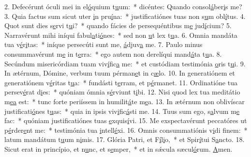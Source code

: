 2. Defecérunt óculi mei in el\uline{ó}quium t\uline{u}um:~* dicéntes: Quando consol\uline{á}ber\uline{i}s me?
3. Quia factus sum sicut uter \uline{i}n pru\uline{í}na:~* justificatiónes tuas non s\uline{u}m obl\uline{í}tus.
4. Quot sunt dies s\uline{e}rvi t\uline{u}i?~* quando fácies de persequéntibus m\uline{e} jud\uline{í}cium?
5. Narravérunt mihi iníqui fabul\uline{a}ti\uline{ó}nes:~* sed non \uline{u}t lex t\uline{u}a.
6. Omnia mandáta tua v\uline{é}r\uline{i}tas:~* iníque persecúti sunt me, \uline{á}djuv\uline{a} me.
7. Paulo minus consummavérunt m\uline{e} in t\uline{e}rra:~* ego autem non derelíqui mand\uline{á}ta t\uline{u}a.
8. Secúndum misericórdiam tuam viv\uline{í}fic\uline{a} me:~* et custódiam testimónia \uline{o}ris t\uline{u}i.
9. In ætérnum, Dómine, verbum tuum pérman\uline{e}t in c\uline{æ}lo.
10. In generatiónem et generatiónem v\uline{é}ritas t\uline{u}a:~* fundásti t\uline{e}rram, et p\uline{é}rmanet.
11. Ordinatióne tua persev\uline{é}rat d\uline{i}es:~* quóniam ómnia s\uline{é}rviunt t\uline{i}bi.
12. Nisi quod lex tua meditátio m\uline{e}\uline{a} est:~* tunc forte periíssem in humilit\uline{á}te m\uline{e}a.
13. In ætérnum non oblivíscar justificati\uline{ó}nes t\uline{u}as:~* quia in ipsis viv\uline{i}fic\uline{á}sti me.
14. Tuus sum ego, s\uline{a}lvum m\uline{e} fac:~* quóniam justificatiónes tuas \uline{e}xquis\uline{í}vi.
15. Me exspectavérunt peccatóres ut p\uline{é}rder\uline{e}nt me:~* testimónia tua \uline{i}ntell\uline{é}xi.
16. Omnis consummatiónis v\uline{i}di f\uline{i}nem:~* latum mandátum t\uline{u}um n\uline{i}mis.
17. Glória Patri, et F\uline{í}l\uline{i}o,~* et Spir\uline{í}tui S\uline{a}ncto.
18. Sicut erat in princípio, et n\uline{u}nc, et s\uline{e}mper,~* et in sǽcula sæcul\uline{ó}rum. \uline{A}men.
